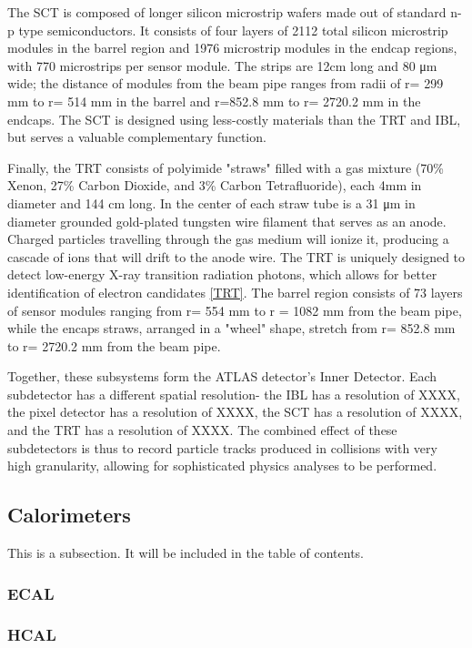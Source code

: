 The SCT is composed of longer silicon microstrip wafers made out of standard n-p type semiconductors. It consists of four layers of 2112 total silicon microstrip modules in the barrel region and 1976 microstrip modules in the endcap regions, with 770 microstrips per sensor module. The strips are 12cm long and 80 μm wide; the distance of modules from the beam pipe ranges from radii of r= 299 mm to r= 514 mm in the barrel and r=852.8 mm to r= 2720.2 mm in the endcaps. The SCT is designed using less-costly materials than the TRT and IBL, but serves a valuable complementary function.

Finally, the TRT consists of polyimide "straws" filled with a gas mixture (70\% Xenon, 27\% Carbon Dioxide, and 3\% Carbon Tetrafluoride), each 4mm in diameter and 144 cm long. In the center of each straw tube is a 31 μm in diameter grounded gold-plated tungsten wire filament that serves as an anode. Charged particles travelling through the gas medium will ionize it, producing a cascade of ions that will drift to the anode wire. The TRT is uniquely designed to detect low-energy X-ray transition radiation photons, which allows for better identification of electron candidates \ref{TRT}. The barrel region consists of 73 layers of sensor modules ranging from r= 554 mm to r = 1082 mm from the beam pipe, while the encaps straws, arranged in a "wheel" shape, stretch from r= 852.8 mm to r= 2720.2 mm from the beam pipe.

Together, these subsystems form the ATLAS detector's Inner Detector. Each subdetector has a different spatial resolution- the IBL has a resolution of XXXX, the pixel detector has a resolution of XXXX, the SCT has a resolution of XXXX, and the TRT has a resolution of XXXX. The combined effect of these subdetectors is thus to record particle tracks produced in collisions with very high granularity, allowing for sophisticated physics analyses to be performed. 

\subsection{Calorimeters} \label{sec:Calos} 

This is a subsection. It will be included in the table of contents. 


\subsubsection{ECAL} \label{sec:ECAL} 

\subsubsection{HCAL} \label{sec:HCAL} 




